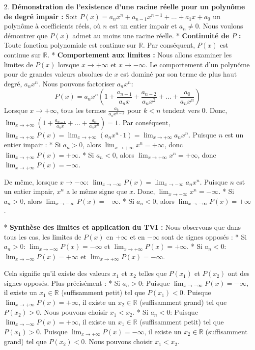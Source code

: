 \documentclass[12pt,a4paper]{report}
\begin{document}
2.  \textbf{Démonstration de l'existence d'une racine réelle pour un polynôme de degré impair :}
    Soit $P(x) = a_n x^n + a_{n-1} x^{n-1} + \dots + a_1 x + a_0$ un polynôme à coefficients réels, où $n$ est un entier impair et $a_n \neq 0$. Nous voulons démontrer que $P(x)$ admet au moins une racine réelle.
    *   \textbf{Continuité de $P$ :} Toute fonction polynomiale est continue sur $\mathbb{R}$. Par conséquent, $P(x)$ est continue sur $\mathbb{R}$.
    *   \textbf{Comportement aux limites :} Nous allons examiner les limites de $P(x)$ lorsque $x \to +\infty$ et $x \to -\infty$. Le comportement d'un polynôme pour de grandes valeurs absolues de $x$ est dominé par son terme de plus haut degré, $a_n x^n$.
        Nous pouvons factoriser $a_n x^n$:
        $$ P(x) = a_n x^n \left( 1 + \frac{a_{n-1}}{a_n x} + \frac{a_{n-2}}{a_n x^2} + \dots + \frac{a_0}{a_n x^n} \right) $$
        Lorsque $x \to +\infty$, tous les termes $\frac{a_{k}}{a_n x^{n-k}}$ pour $k < n$ tendent vers $0$.
        Donc, $\lim_{x \to +\infty} \left( 1 + \frac{a_{n-1}}{a_n x} + \dots + \frac{a_0}{a_n x^n} \right) = 1$.
        Par conséquent, $\lim_{x \to +\infty} P(x) = \lim_{x \to +\infty} (a_n x^n \cdot 1) = \lim_{x \to +\infty} a_n x^n$.
        Puisque $n$ est un entier impair :
        *   Si $a_n > 0$, alors $\lim_{x \to +\infty} x^n = +\infty$, donc $\lim_{x \to +\infty} P(x) = +\infty$.
        *   Si $a_n < 0$, alors $\lim_{x \to +\infty} x^n = +\infty$, donc $\lim_{x \to +\infty} P(x) = -\infty$.

        De même, lorsque $x \to -\infty$:
        $\lim_{x \to -\infty} P(x) = \lim_{x \to -\infty} a_n x^n$.
        Puisque $n$ est un entier impair, $x^n$ a le même signe que $x$. Donc, $\lim_{x \to -\infty} x^n = -\infty$.
        *   Si $a_n > 0$, alors $\lim_{x \to -\infty} P(x) = -\infty$.
        *   Si $a_n < 0$, alors $\lim_{x \to -\infty} P(x) = +\infty$.

    *   \textbf{Synthèse des limites et application du TVI :}
        Nous observons que dans tous les cas, les limites de $P(x)$ en $+\infty$ et en $-\infty$ sont de signes opposés :
        *   Si $a_n > 0$: $\lim_{x \to -\infty} P(x) = -\infty$ et $\lim_{x \to +\infty} P(x) = +\infty$.
        *   Si $a_n < 0$: $\lim_{x \to -\infty} P(x) = +\infty$ et $\lim_{x \to +\infty} P(x) = -\infty$.

        Cela signifie qu'il existe des valeurs $x_1$ et $x_2$ telles que $P(x_1)$ et $P(x_2)$ ont des signes opposés.
        Plus précisément :
        *   Si $a_n > 0$: Puisque $\lim_{x \to -\infty} P(x) = -\infty$, il existe un $x_1 \in \mathbb{R}$ (suffisamment petit) tel que $P(x_1) < 0$. Puisque $\lim_{x \to +\infty} P(x) = +\infty$, il existe un $x_2 \in \mathbb{R}$ (suffisamment grand) tel que $P(x_2) > 0$. Nous pouvons choisir $x_1 < x_2$.
        *   Si $a_n < 0$: Puisque $\lim_{x \to -\infty} P(x) = +\infty$, il existe un $x_1 \in \mathbb{R}$ (suffisamment petit) tel que $P(x_1) > 0$. Puisque $\lim_{x \to +\infty} P(x) = -\infty$, il existe un $x_2 \in \mathbb{R}$ (suffisamment grand) tel que $P(x_2) < 0$. Nous pouvons choisir $x_1 < x_2$.
\end{document}
